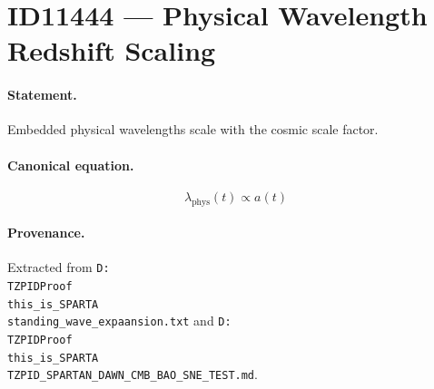 \section*{ID11444 --- Physical Wavelength Redshift Scaling}

\paragraph{Statement.}
Embedded physical wavelengths scale with the cosmic scale factor.

\paragraph{Canonical equation.}
\[
\lambda_{\mathrm{phys}}(t)\propto a(t)
\]

\paragraph{Provenance.}
Extracted from \texttt{D:\\TZPIDProof\\this\_is\_SPARTA\\standing\_wave\_expaansion.txt} and \texttt{D:\\TZPIDProof\\this\_is\_SPARTA\\TZPID\_SPARTAN\_DAWN\_CMB\_BAO\_SNE\_TEST.md}.
